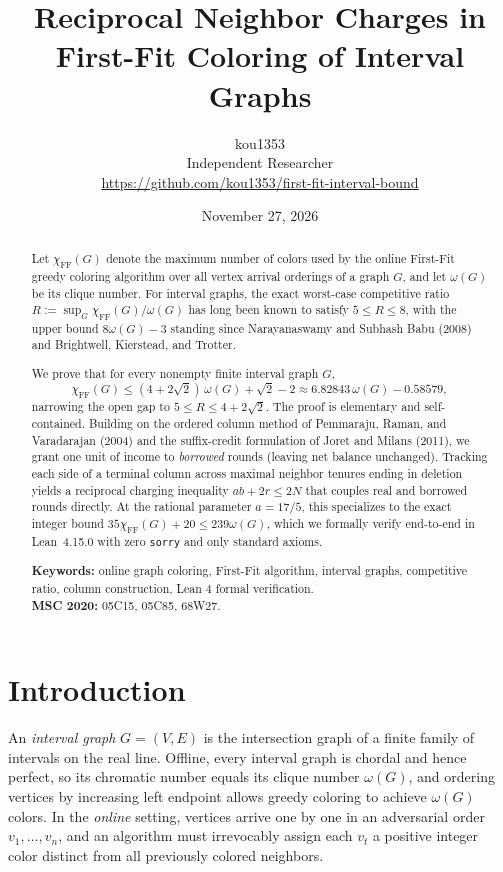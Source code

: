 \documentclass[11pt,a4paper]{article}
\title{\textbf{Reciprocal Neighbor Charges in First-Fit Coloring of Interval Graphs}}
\author{kou1353\\
\small Independent Researcher \\
\small \url{https://github.com/kou1353/first-fit-interval-bound}}
\date{November 27, 2026}
\theoremstyle{remark}
\newcommand{\chiFF}{\chi_{\mathrm{FF}}}
\begin{document}
\maketitle

\begin{abstract}
Let $\chiFF(G)$ denote the maximum number of colors used by the online First-Fit greedy coloring algorithm over all vertex arrival orderings of a graph $G$, and let $\omega(G)$ be its clique number. For interval graphs, the exact worst-case competitive ratio $R := \sup_{G} \chiFF(G)/\omega(G)$ has long been known to satisfy $5 \le R \le 8$, with the upper bound $8\omega(G)-3$ standing since Narayanaswamy and Subhash Babu (2008) and Brightwell, Kierstead, and Trotter.

We prove that for every nonempty finite interval graph $G$,
\[
  \chiFF(G) \le (4 + 2\sqrt{2})\,\omega(G) + \sqrt{2} - 2 \approx 6.82843\,\omega(G) - 0.58579,
\]
narrowing the open gap to $5 \le R \le 4 + 2\sqrt{2}$. The proof is elementary and self-contained. Building on the ordered column method of Pemmaraju, Raman, and Varadarajan (2004) and the suffix-credit formulation of Joret and Milans (2011), we grant one unit of income to \emph{borrowed} rounds (leaving net balance unchanged). Tracking each side of a terminal column across maximal neighbor tenures ending in deletion yields a reciprocal charging inequality $ab + 2r \le 2N$ that couples real and borrowed rounds directly. At the rational parameter $a = 17/5$, this specializes to the exact integer bound $35\chiFF(G) + 20 \le 239\omega(G)$, which we formally verify end-to-end in Lean~4.15.0 with zero \texttt{sorry} and only standard axioms.

\medskip
\noindent\textbf{Keywords:} online graph coloring, First-Fit algorithm, interval graphs, competitive ratio, column construction, Lean 4 formal verification.\\
\noindent\textbf{MSC 2020:} 05C15, 05C85, 68W27.
\end{abstract}

\section{Introduction}

An \emph{interval graph} $G = (V, E)$ is the intersection graph of a finite family of intervals on the real line. Offline, every interval graph is chordal and hence perfect, so its chromatic number equals its clique number $\omega(G)$, and ordering vertices by increasing left endpoint allows greedy coloring to achieve $\omega(G)$ colors. In the \emph{online} setting, vertices arrive one by one in an adversarial order $v_1, \dots, v_n$, and an algorithm must irrevocably assign each $v_t$ a positive integer color distinct from all previously colored neighbors.
\end{document}

